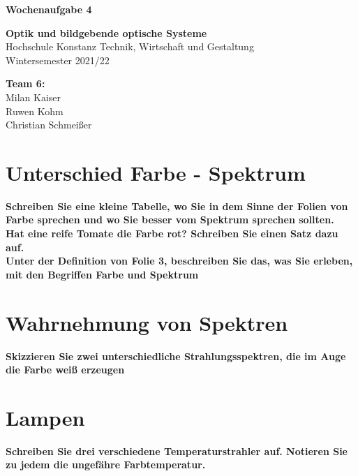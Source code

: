 \documentclass[a4paper]{article}
\begin{document}
	\thispagestyle{empty}
	
	\begin{center}\strut
		\bfseries\Huge
		Wochenaufgabe 4
	\end{center}
	\vfill
	
	\begin{center}\strut
		\textbf{Optik und bildgebende optische Systeme}\\
		Hochschule Konstanz Technik, Wirtschaft und Gestaltung\\
		Wintersemester 2021/22
	\end{center}
	
	\begin{center}\strut
		\textbf{Team 6:}\\
		Milan Kaiser\\
		Ruwen Kohm\\
		Christian Schmeißer\\
	\end{center}
	\vfill
	\vfill

	\clearpage
	
	\section{Unterschied Farbe - Spektrum}
	\textbf{Schreiben Sie eine kleine Tabelle, wo Sie in dem Sinne der Folien von Farbe sprechen und wo Sie besser vom Spektrum sprechen sollten.}\\
	
	\textbf{Hat eine reife Tomate die Farbe rot? Schreiben Sie einen Satz dazu auf.}\\
	
	\textbf{Unter der Definition von Folie 3, beschreiben Sie das, was Sie erleben, mit den Begriffen Farbe und Spektrum}\\
	
	
	\section{Wahrnehmung von Spektren}
	\textbf{Skizzieren Sie zwei unterschiedliche Strahlungsspektren, die im Auge die Farbe weiß erzeugen}\\
	
	\section{Lampen}
	\textbf{Schreiben Sie drei verschiedene Temperaturstrahler auf. Notieren Sie zu jedem die ungefähre Farbtemperatur.}\\
	
\end{document}
